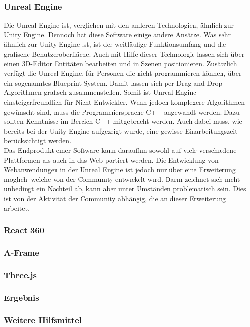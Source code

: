 \documentclass[a4paper,12pt,oneside]{article}
\begin{document}
      \subsubsection{Unreal Engine}
        Die Unreal Engine ist, verglichen mit den anderen Technologien, ähnlich zur 
        Unity Engine. Dennoch hat diese Software einige andere Ansätze. Was sehr ähnlich
        zur Unity Engine ist, ist der weitläufige Funktionsumfang und die grafische 
        Benutzeroberfläche. Auch mit Hilfe dieser Technologie lassen sich über 
        einen 3D-Editor Entitäten bearbeiten und in Szenen positionieren. 
        Zusätzlich verfügt die Unreal Engine,
        für Personen die nicht programmieren können, über ein sogenanntes Blueprint-System.
        Damit lassen sich per Drag and Drop Algorithmen grafisch zusammenstellen. Somit
        ist Unreal Engine einsteigerfreundlich für Nicht-Entwickler.
        Wenn jedoch komplexere Algorithmen gewünscht sind, muss die Programmiersprache
        C++ angewandt werden. Dazu sollten Kenntnisse im Bereich C++ 
        mitgebracht werden. Auch dabei muss, wie bereits bei der Unity Engine aufgezeigt
        wurde, eine gewisse Einarbeitungszeit berücksichtigt werden. \\
        Das Endprodukt einer Software kann daraufhin sowohl auf viele verschiedene Plattformen 
        als auch in das Web portiert werden. Die Entwicklung von Webanwendungen
        in der Unreal Engine ist jedoch nur über eine Erweiterung möglich, welche von 
        der Community entwickelt wird. Darin zeichnet sich nicht unbedingt ein Nachteil ab, 
        kann aber unter Umständen problematisch sein. Dies ist von der Aktivität 
        der Community abhängig, die an dieser Erweiterung arbeitet.
      \subsubsection{React 360}
      \subsubsection{A-Frame}
      \subsubsection{Three.js}
      \subsubsection{Ergebnis}
      \subsubsection{Weitere Hilfsmittel}
\end{document}
